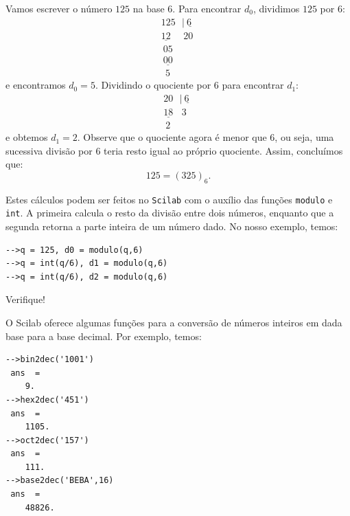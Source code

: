 \documentclass[main.tex]{subfiles}
\begin{document}
\begin{ex} Vamos escrever o número $125$ na base $6$. Para encontrar $d_0$, dividimos $125$ por $6$:
  \begin{equation*}
    \begin{array}{l}
      125 \ \ \ |\! \underline{\ 6\ \ } \\
      \underline{12 }\ \ \ \ \ \ 20\\
      \ 05\\
      \ \underline{00}\\
      \ \ 5
    \end{array}
  \end{equation*}
e encontramos $d_0=5$. Dividindo o quociente por $6$ para encontrar $d_1$:
\begin{equation*}
  \begin{array}{l}
    20 \ \ \ |\! \underline{\ 6\ \ } \\
    \underline{18 }\ \ \ \ 3\\
    \ 2
  \end{array}    
\end{equation*}
e obtemos $d_1=2$. Observe que o quociente agora é menor que $6$, ou seja, uma sucessiva divisão por $6$ teria resto igual ao próprio quociente. Assim, concluímos que:
\begin{equation*}
  125=(325)_6.
\end{equation*}

\ifisscilab
Estes cálculos podem ser feitos no \verb+Scilab+ com o auxílio das funções \verb'modulo' e \verb'int'. A primeira calcula o resto da divisão entre dois números, enquanto que a segunda retorna a parte inteira de um número dado. No nosso exemplo, temos:
\begin{verbatim}
-->q = 125, d0 = modulo(q,6)
-->q = int(q/6), d1 = modulo(q,6)
-->q = int(q/6), d2 = modulo(q,6)
\end{verbatim}
Verifique!
\fi
\end{ex}

\ifisscilab
\begin{ex}[Scilab]
  O Scilab oferece algumas funções para a conversão de números inteiros em dada base para a base decimal. Por exemplo, temos:
\begin{verbatim}
-->bin2dec('1001')
 ans  =
    9.  
-->hex2dec('451')
 ans  =
    1105.  
-->oct2dec('157')
 ans  =
    111.
-->base2dec('BEBA',16)
 ans  =
    48826.  
\end{verbatim}
\end{ex}
\fi
\end{document}
